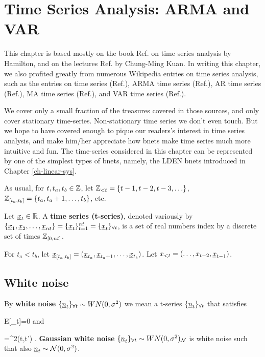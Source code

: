 \chapter{Time Series Analysis: 
ARMA and VAR}\label{ch-time-arma}



This chapter is based mostly 
on the book  Ref.\cite{hamilton2020time}
on time series analysis by Hamilton, 
and on the lectures Ref. \cite{t-series-kuan}
by Chung-Ming Kuan.
In writing this chapter, we also profited greatly
from numerous Wikipedia entries on time series
analysis,
such as  the entries
on 
time series (Ref.\cite{wiki-time-series}),
ARMA time series (Ref.\cite{wiki-ARMA}),
AR time series (Ref.\cite{wiki-AR}),
MA time series (Ref.\cite{wiki-MA}), and
VAR time series (Ref.\cite{wiki-VAR}).



We cover only a small fraction
 of the  treasures
covered in those sources, 
and only
cover stationary 
time-series. Non-stationary 
time series
we don't even touch.
But we hope to have covered 
enough to pique 
our readers's interest in time series analysis,
and make him/her appreciate
how bnets make
 time series much more 
intuitive and fun.
The time-series 
considered in this chapter
can 
be represented 
by one of the
simplest
types of
bnets, namely, the LDEN bnets
introduced in 
Chapter \ref{ch-linear-sys}.



As usual, for $t, t_a, t_b\in {\mathbb{Z}}$,
 let
 ${\mathbb{Z}}_{<t}=
\{t-1, t-2, t-3, \ldots\}$,
${\mathbb{Z}}_{[t_a, t_b]}=\{t_a, t_a+1, 
\ldots, t_b\}$, etc.

Let ${\underline{x}}_t\in { \mathbb{R}}$.
A 
{\bf time series (t-series)},
denoted variously by
$\{{\underline{x}}_1, {\underline{x}}_2, \ldots,
{\underline{x}}_{nt}\}
=\{{\underline{x}}_t\}_{t=1}^{nt}
={\{{\underline{x}}_t\}_{\forall t}}$,
is a set of real numbers
index by a discrete set of times
${\mathbb{Z}}_{[0, nt]}$.


For $t_a<t_b$, let 
${\underline{x}}_{[t_a, t_b]}=({\underline{x}}_{t_a}, 
{\underline{x}}_{t_a+1},
 \ldots, {\underline{x}}_{t_b})$.
Let $x_{<t}=(\ldots, x_{t-2}, {\underline{x}}_{t-1})$.

\section{White noise}

By {\bf white noise} 
${\{{\underline{n}}_t\}_{\forall t}}\sim  WN(0, \sigma^2)$
we mean a t-series ${\{{\underline{n}}_t\}_{\forall t}}$
that satisfies

\beq
E[\rvn_t]=0
\eeq
and

\beq
{}=\s^2\delta(t,t')
\;.
\eeq
{\bf Gaussian white noise}
${\{{\underline{n}}_t\}_{\forall t}}\sim WN(0, \sigma^2)_{\cal N}$
is white noise such that also
${\underline{n}}_t\sim {\cal N}(0, \sigma^2)$.

